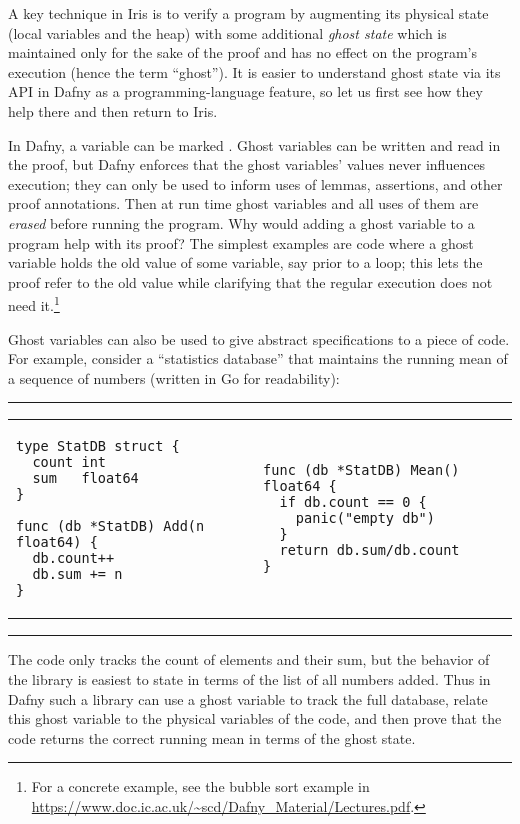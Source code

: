A key technique in Iris is to verify a program by augmenting its
physical state (local variables and the heap) with some additional \emph{ghost
state} which is maintained only for the sake of the proof and has no effect on
the program's execution (hence the term ``ghost''). It is easier to understand
ghost state via its API in Dafny as a programming-language feature, so let
us first see how they help there and then return to Iris.

In Dafny, a variable can be marked . Ghost variables can be written
and read in the proof, but Dafny enforces that the ghost variables' values never
influences execution; they can only be used to inform uses of lemmas,
assertions, and other proof annotations. Then at run time ghost variables and all
uses of them are \emph{erased} before running the program. Why would adding a
ghost variable to a program help with its proof? The simplest examples are code
where a ghost variable holds the old value of some variable, say prior to a
loop; this lets the proof refer to the old value while clarifying that the
regular execution does not need it.\footnote{For a concrete example, see the
bubble sort example in
\url{https://www.doc.ic.ac.uk/~scd/Dafny_Material/Lectures.pdf}.}

\pagebreak[1]
Ghost variables can also be used to give abstract specifications to a piece of
code. For example, consider a ``statistics database'' that maintains the running
mean of a sequence of numbers (written in Go for readability):
\nopagebreak
\vspace{\baselineskip}
\hrule\nopagebreak
\vspace{-12pt}\nopagebreak
\noindent\begin{tabular}{p{} p{}}
\begin{verbatim}
type StatDB struct {
  count int
  sum   float64
}

func (db *StatDB) Add(n float64) {
  db.count++
  db.sum += n
}
\end{verbatim}
&
\begin{verbatim}
func (db *StatDB) Mean() float64 {
  if db.count == 0 {
    panic("empty db")
  }
  return db.sum/db.count
}
\end{verbatim}
\end{tabular}
\vspace{-8pt}
\hrule
\vspace{\baselineskip}

The code only tracks the count of elements and
their sum, but the behavior of the library is easiest to state in terms of the list of all
numbers added. Thus in Dafny such a library can use a ghost variable to track
the full database, relate this ghost variable to the physical variables
of the code, and then prove that the code returns the correct running mean in
terms of the ghost state.

